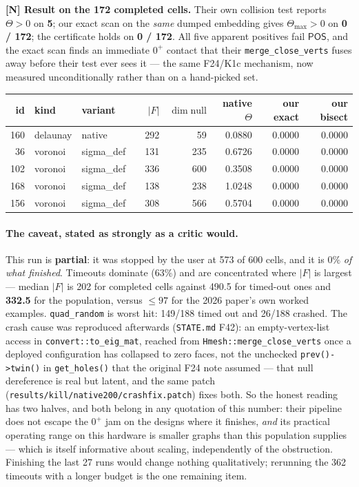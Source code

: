 \documentclass[11pt,a4paper]{article}
\theoremstyle{definition}
\newcommand{\Tmax}{\Theta_{\max}}
\newcommand{\file}[1]{\texttt{\small #1}}
\newcommand{\POS}{\textsf{POS}}
\begin{document}
\noindent \textbf{[N] Result on the 172 completed cells.} Their own collision test reports
$\Theta>0$ on \textbf{5}; our exact scan on the \emph{same} dumped embedding gives $\Tmax>0$
on \textbf{0 / 172}; the certificate holds on \textbf{0 / 172}. All five apparent positives
fail $\POS$, and the exact scan finds an immediate $0^+$ contact that their
\file{merge\_close\_verts} fuses away before their test ever sees it --- the same F24/K1c
mechanism, now measured unconditionally rather than on a hand-picked set.

\begin{center}
\small
\begin{tabular}{@{}rlllrrrrr@{}}
\toprule
id & kind & variant & & $|F|$ & $\dim\mathrm{null}$ & native $\Theta$ & our exact & our bisect \\
\midrule
160 & delaunay & native & & 292 & 59 & 0.0880 & 0.0000 & 0.0000 \\
36 & voronoi & sigma\_def & & 131 & 235 & 0.6726 & 0.0000 & 0.0000 \\
102 & voronoi & sigma\_def & & 336 & 600 & 0.3508 & 0.0000 & 0.0000 \\
168 & voronoi & sigma\_def & & 138 & 238 & 1.0248 & 0.0000 & 0.0000 \\
156 & voronoi & sigma\_def & & 308 & 566 & 0.5704 & 0.0000 & 0.0000 \\
\bottomrule
\end{tabular}
\end{center}

\paragraph{The caveat, stated as strongly as a critic would.} This run is \textbf{partial}: it
was stopped by the user at 573 of 600 cells, and it is $0\%$ \emph{of what finished}. Timeouts
dominate (63\%) and are concentrated where $|F|$ is largest --- median $|F|$ is 202 for
completed cells against 490.5 for timed-out ones and \textbf{332.5} for the population, versus
$\le97$ for the 2026 paper's own worked examples. \file{quad\_random} is worst hit: 149/188
timed out and 26/188 crashed. The crash cause was reproduced afterwards (\file{STATE.md} F42):
an empty-vertex-list access in \file{convert::to\_eig\_mat}, reached from
\file{Hmesh::merge\_close\_verts} once a deployed configuration has collapsed to zero faces,
not the unchecked \file{prev()->twin()} in \file{get\_holes()} that the original F24 note
assumed --- that null dereference is real but latent, and the same patch
(\file{results/kill/native200/crashfix.patch}) fixes both. So the honest reading has two halves, and both belong
in any quotation of this number: their pipeline does not escape the $0^+$ jam on the designs
where it finishes, \emph{and} its practical operating range on this hardware is smaller graphs
than this population supplies --- which is itself informative about scaling, independently of
the obstruction. Finishing the last 27 runs would change nothing qualitatively; rerunning the
362 timeouts with a longer budget is the one remaining item.
\end{document}
